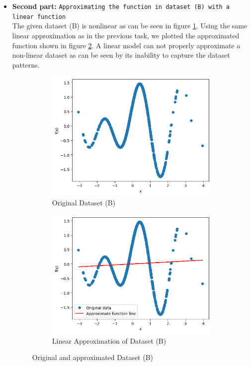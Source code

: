 \begin{itemize}
\item \textbf{Second part: }\texttt{Approximating the function in dataset (B) with a linear function}\\
The given dataset (B) is nonlinear as can be seen in figure \ref{task5_2Original}. Using the same linear approximation as in the previous task, we plotted the approximated function shown in figure \ref{task5_2Approximated}. A linear model can not properly approximate a non-linear dataset as can be seen by its inability to capture the dataset patterns.

\begin{figure}[H]
    \centering
    \begin{subfigure}{0.45\textwidth}
        \centering
        \includegraphics[width=\linewidth]{images/ex5task1_2Original.png}
        \caption{Original Dataset (B)}
        \label{task5_2Original}
    \end{subfigure}
    \begin{subfigure}{0.45\textwidth}
    \centering
        \includegraphics[width=\linewidth]{images/ex5task1_2.png}
        \caption{Linear Approximation of Dataset (B)}
        \label{task5_2Approximated}
    \end{subfigure}
    \caption{Original and approximated Dataset (B)}
    \label{task5_1_2}
\end{figure}


\end{itemize}
